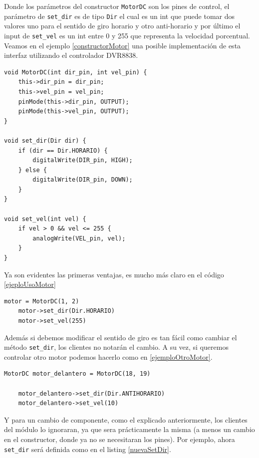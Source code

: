Donde los parámetros del constructor \verb|MotorDC| son los pines de control, el parámetro de \verb|set_dir| es de tipo \verb|Dir| el cual es un int que puede tomar dos valores uno para el sentido de giro horario y otro anti-horario y por último el input de \verb|set_vel| es un int entre 0 y 255 que representa la velocidad porcentual. Veamos en el ejemplo \ref{constructorMotor} una posible implementación de esta interfaz utilizando el controlador DVR8838.

\begin{lstlisting}[caption=Posible implementación de la interfaz del módulo MotorDC,label={constructorMotor}]
void MotorDC(int dir_pin, int vel_pin) {
    this->dir_pin = dir_pin;
    this->vel_pin = vel_pin;
    pinMode(this->dir_pin, OUTPUT);
    pinMode(this->vel_pin, OUTPUT);
}

void set_dir(Dir dir) {
    if (dir == Dir.HORARIO) {
        digitalWrite(DIR_pin, HIGH);
    } else {
        digitalWrite(DIR_pin, DOWN);
    }
}

void set_vel(int vel) {
    if vel > 0 && vel <= 255 {
        analogWrite(VEL_pin, vel);
    }
}
\end{lstlisting}

Ya son evidentes las primeras ventajas, es mucho más claro en el código \ref{ejeploUsoMotor}

\begin{lstlisting}[caption=Ejmplo de uso de la interfaz del módulo MotorDC, label={ejeploUsoMotor}]
	motor = MotorDC(1, 2)
    motor->set_dir(Dir.HORARIO)
    motor->set_vel(255)
\end{lstlisting}

Además si debemos modificar el sentido de giro es tan fácil como cambiar el método \verb|set_dir|, los clientes no notarán el cambio. A su vez, si queremos controlar otro motor podemos hacerlo como en \ref{ejemploOtroMotor}. 

\begin{lstlisting}[caption=Ejemplo control nuevo motor,label={ejemploOtroMotor}]
    MotorDC motor_delantero = MotorDC(18, 19)

    motor_delantero->set_dir(Dir.ANTIHORARIO)
    motor_delantero->set_vel(10)
\end{lstlisting}

Y para un cambio de componente, como el explicado anteriormente, los clientes del módulo lo ignoraran, ya que sera prácticamente la misma (a menos un cambio en el constructor, donde ya no se necesitaran los pines). Por ejemplo, ahora \verb|set_dir| será definida como en el listing \ref{nuevaSetDir}.

